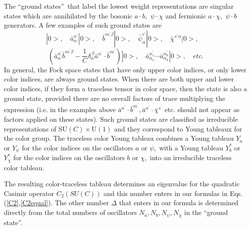 \documentclass[a4paper,aps,preprint,nofootinbib]{revtex4}
\begin{document}
The \textquotedblleft ground states\textquotedblright\ that label the lowest
weight representations are singular states which are annihilated by the
bosonic $a\cdot b,$ $\psi\cdot\chi$ and fermionic $a\cdot\chi,$ $\psi\cdot b$
generators. A few examples of such ground states are
\begin{equation}
|0>,\quad\bar{a}_{\alpha}^{n^{\prime}}|0>,\quad\bar{b}^{m^{\prime}\beta
}|0>,\quad\bar{\psi}_{\alpha}^{r^{\prime}}|0>,\quad\bar{\chi}^{s^{\prime
}\alpha}|0>,\quad
\end{equation}%
\begin{equation}
\left( \bar{a}_{\alpha}^{n^{\prime}}\bar{b}^{m^{\prime}\beta}-\frac{1}{C}
\delta_{\alpha}^{\,\beta}\bar{a}^{n^{\prime}}\cdot\bar{b}^{m^{\prime}}
\right) |0>,\quad\bar{a}_{\alpha_{1}}^{n_{1}^{\prime}}\cdots\bar{a}
_{\alpha_{k}}^{n_{k}^{\prime}}|0>,\quad etc.
\end{equation}
In general, the Fock space states that have only upper color indices, or
only lower color indices, are always ground states. When there are both
upper and lower color indices, if they form a traceless tensor in color
space, then the state is also a ground state, provided there are no overall
factors of trace multiplying the expression (i.e. in the examples above $
\bar{a}^{n^{\prime}}\cdot\bar{b}^{m^{\prime}},\bar{a}^{n^{\prime}}\cdot\bar{
\chi}^{s^{\prime}}$ etc. should not appear as factors applied on these
states). Such ground states are classified as irreducible representations of
SU$\left( C\right) \times $U$\left( 1\right) $ and they correspond to Young
tableaux for the color group. The traceless color Young tableau combines a
Young tableau $Y_{a}$ or $Y_{\psi}$ for the color indices on the oscillators
$a$ or $\psi,$ with a Young tableau $Y_{b}^{\ast}$ or $Y_{\chi}^{\ast}$ for
the color indices on the oscillators $b$ or $\chi,$ into an irreducible
traceless color tableau.

The resulting color-traceless tableau determines an eigenvalue for the
quadratic Casimir operator $C_{2}\left( SU\left( C\right) \right) $ and this
number enters in our formulas in Eqs.(\ref{C2},\ref{C2equal}). The other
number $\Delta$ that enters in our formula is determined directly from the
total numbers of oscillators $N_{a},N_{b},N_{\psi},N_{\chi}$ in the
\textquotedblleft ground state\textquotedblright.
\end{document}
